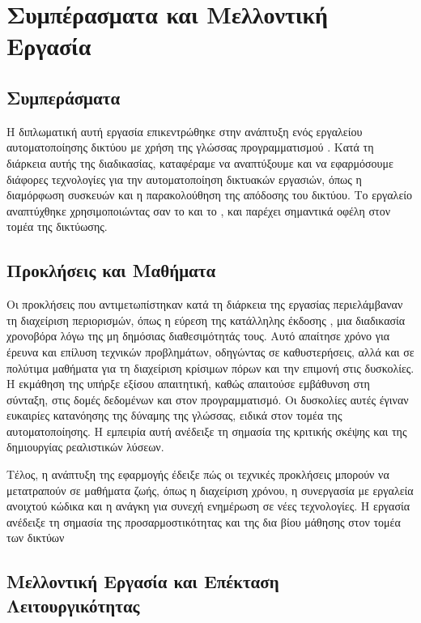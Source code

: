 
\chapter{Συμπέρασματα και Μελλοντική Εργασία}

\section{Συμπεράσματα}

Η διπλωματική αυτή εργασία επικεντρώθηκε στην ανάπτυξη ενός εργαλείου αυτοματοποίησης 
δικτύου με χρήση της γλώσσας προγραμματισμού . 
Κατά τη διάρκεια αυτής της διαδικασίας, καταφέραμε να αναπτύξουμε και να 
εφαρμόσουμε διάφορες τεχνολογίες για την αυτοματοποίηση δικτυακών εργασιών, 
όπως η διαμόρφωση συσκευών και η παρακολούθηση της απόδοσης του δικτύου. 
Το εργαλείο αναπτύχθηκε χρησιμοποιώντας σαν  το  και το , 
και παρέχει σημαντικά οφέλη στον τομέα της δικτύωσης.




\section{Προκλήσεις και Μαθήματα}


Οι προκλήσεις που αντιμετωπίστηκαν κατά τη διάρκεια της 
εργασίας περιελάμβαναν τη διαχείριση περιορισμών, όπως η 
εύρεση της κατάλληλης έκδοσης , μια διαδικασία 
χρονοβόρα λόγω της μη δημόσιας διαθεσιμότητάς τους. 
Αυτό απαίτησε χρόνο για έρευνα και επίλυση τεχνικών προβλημάτων, 
οδηγώντας σε καθυστερήσεις, αλλά και σε πολύτιμα μαθήματα για τη 
διαχείριση κρίσιμων πόρων και την επιμονή στις δυσκολίες. Η εκμάθηση 
της  υπήρξε εξίσου απαιτητική, καθώς απαιτούσε 
εμβάθυνση στη σύνταξη, στις δομές δεδομένων και στον προγραμματισμό. 
Οι δυσκολίες αυτές έγιναν ευκαιρίες κατανόησης της δύναμης της 
γλώσσας, ειδικά στον τομέα της αυτοματοποίησης. Η εμπειρία αυτή 
ανέδειξε τη σημασία της κριτικής σκέψης και της δημιουργίας 
ρεαλιστικών λύσεων.

Τέλος, η ανάπτυξη της εφαρμογής έδειξε πώς οι 
τεχνικές προκλήσεις μπορούν να μετατραπούν σε μαθήματα ζωής, 
όπως η διαχείριση χρόνου, η συνεργασία με εργαλεία ανοιχτού 
κώδικα και η ανάγκη για συνεχή ενημέρωση σε νέες τεχνολογίες. 
Η εργασία ανέδειξε τη σημασία της προσαρμοστικότητας και της 
δια βίου μάθησης στον τομέα των δικτύων

\section{Μελλοντική Εργασία και Επέκταση Λειτουργικότητας}

